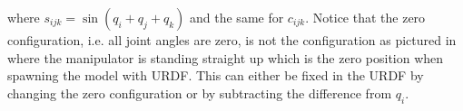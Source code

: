 where $s_{ijk} = \sin{(q_i + q_j + q_k)}$ and the same for $c_{ijk}$. Notice that the zero configuration, i.e. all joint angles are zero, is not the configuration as pictured in  where the manipulator is standing straight up which is the zero position when spawning the model with URDF. This can either be fixed in the URDF by changing the zero configuration or by subtracting the difference from $q_i$.

